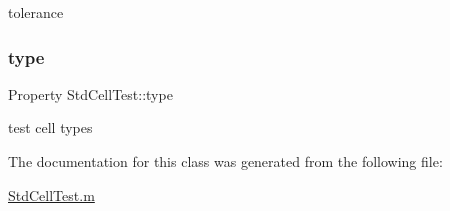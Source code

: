 tolerance 

\mbox{\label{class_std_cell_test_a682c89deef81edd34d9e5fe7c84a022c}} 
\subsubsection{\texorpdfstring{type}{type}}
{\footnotesize\ttfamily Property Std\+Cell\+Test\+::type}



test cell types 



The documentation for this class was generated from the following file\+:\begin{DoxyCompactItemize}
\item 
\hyperlink{_std_cell_test_8m}{Std\+Cell\+Test.\+m}\end{DoxyCompactItemize}
